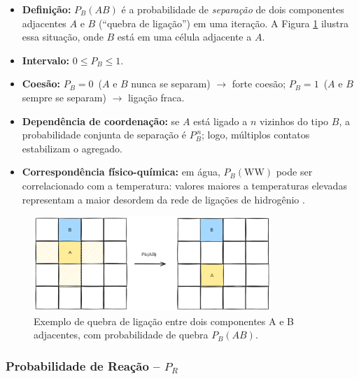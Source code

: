 \documentclass[12pt,oneside]{report}
\begin{document}
\begin{itemize}
    \item \textbf{Definição:} $P_B(AB)$ é a probabilidade de
          \emph{separação} de dois componentes adjacentes $A$ e $B$
          (``quebra de ligação'') em uma iteração. A Figura \ref{fig:quebra_ligacao} ilustra essa situação, onde $B$ está em uma célula adjacente a $A$.
    \item \textbf{Intervalo:} $0 \le P_B \le 1$.
    \item \textbf{Coesão:} $P_B=0$ \,($A$ e $B$ nunca se separam)
          $\rightarrow$ forte coesão;
          $P_B=1$ \,($A$ e $B$ sempre se separam) $\rightarrow$ ligação fraca.
    \item \textbf{Dependência de coordenação:} se $A$ está ligado a
          $n$ vizinhos do tipo $B$, a probabilidade conjunta de separação é
          $P_B^{\,n}$; logo, múltiplos contatos estabilizam o agregado.
    \item \textbf{Correspondência físico-química:}
          em água, $P_B(\mathrm{WW})$ pode ser correlacionado com a temperatura:
          valores maiores a temperaturas elevadas representam a maior
          desordem da rede de ligações de hidrogênio \cite{kier2005}.
\end{itemize}

\begin{figure}[H]
    \centering
    \includegraphics[width=0.8\textwidth]{PbAB.png}
    \caption{\small Exemplo de quebra de ligação entre dois componentes A e B adjacentes, com probabilidade de quebra $P_B(AB)$.}
    \label{fig:quebra_ligacao}
\end{figure}

\subsubsection{Probabilidade de Reação – \texorpdfstring{$P_R$}{Pr}}
\label{subsubsec:Pr}
\end{document}
